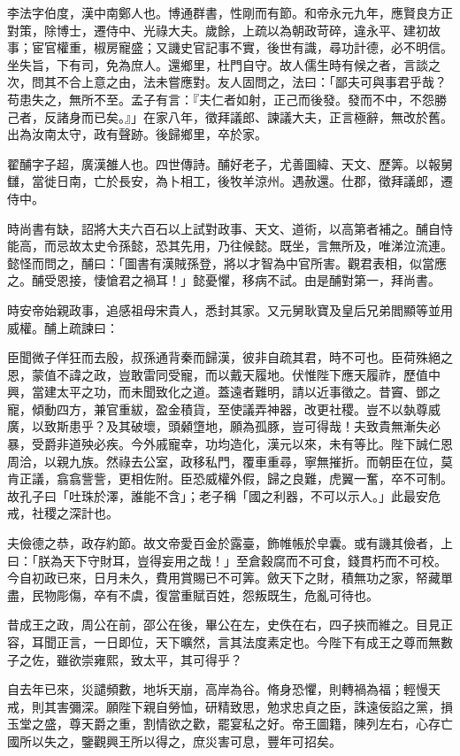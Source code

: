 \begin{pinyinscope}
李法字伯度，漢中南鄭人也。博通群書，性剛而有節。和帝永元九年，應賢良方正對策，除博士，遷侍中、光祿大夫。歲餘，上疏以為朝政苛碎，違永平、建初故事；宦官權重，椒房寵盛；又譏史官記事不實，後世有識，尋功計德，必不明信。坐失旨，下有司，免為庶人。還鄉里，杜門自守。故人儒生時有候之者，言談之次，問其不合上意之由，法未嘗應對。友人固問之，法曰：「鄙夫可與事君乎哉？苟患失之，無所不至。孟子有言：『夫仁者如射，正己而後發。發而不中，不怨勝己者，反諸身而已矣。』」在家八年，徵拜議郎、諫議大夫，正言極辭，無改於舊。出為汝南太守，政有聲跡。後歸鄉里，卒於家。

翟酺字子超，廣漢雒人也。四世傳詩。酺好老子，尤善圖緯、天文、歷筭。以報舅讎，當徙日南，亡於長安，為卜相工，後牧羊涼州。遇赦還。仕郡，徵拜議郎，遷侍中。

時尚書有缺，詔將大夫六百石以上試對政事、天文、道術，以高第者補之。酺自恃能高，而忌故太史令孫懿，恐其先用，乃往候懿。既坐，言無所及，唯涕泣流連。懿怪而問之，酺曰：「圖書有漢賊孫登，將以才智為中官所害。觀君表相，似當應之。酺受恩接，悽愴君之禍耳！」懿憂懼，移病不試。由是酺對第一，拜尚書。

時安帝始親政事，追感祖母宋貴人，悉封其家。又元舅耿寶及皇后兄弟閻顯等並用威權。酺上疏諫曰：

臣聞微子佯狂而去殷，叔孫通背秦而歸漢，彼非自疏其君，時不可也。臣荷殊絕之恩，蒙值不諱之政，豈敢雷同受寵，而以戴天履地。伏惟陛下應天履祚，歷值中興，當建太平之功，而未聞致化之道。蓋遠者難明，請以近事徵之。昔竇、鄧之寵，傾動四方，兼官重紱，盈金積貨，至使議弄神器，改更社稷。豈不以埶尊威廣，以致斯患乎？及其破壞，頭顙墯地，願為孤豚，豈可得哉！夫致貴無漸失必暴，受爵非道殃必疾。今外戚寵幸，功均造化，漢元以來，未有等比。陛下誠仁恩周洽，以親九族。然祿去公室，政移私門，覆車重尋，寧無摧折。而朝臣在位，莫肯正議，翕翕訾訾，更相佐附。臣恐威權外假，歸之良難，虎翼一奮，卒不可制。故孔子曰「吐珠於澤，誰能不含」；老子稱「國之利器，不可以示人。」此最安危戒，社稷之深計也。

夫儉德之恭，政存約節。故文帝愛百金於露臺，飾帷帳於皁囊。或有譏其儉者，上曰：「朕為天下守財耳，豈得妄用之哉！」至倉穀腐而不可食，錢貫朽而不可校。今自初政已來，日月未久，費用賞賜已不可筭。斂天下之財，積無功之家，帑藏單盡，民物彫傷，卒有不虞，復當重賦百姓，怨叛既生，危亂可待也。

昔成王之政，周公在前，邵公在後，畢公在左，史佚在右，四子挾而維之。目見正容，耳聞正言，一日即位，天下曠然，言其法度素定也。今陛下有成王之尊而無數子之佐，雖欲崇雍熙，致太平，其可得乎？

自去年已來，災譴頻數，地坼天崩，高岸為谷。脩身恐懼，則轉禍為福；輕慢天戒，則其害彌深。願陛下親自勞恤，研精致思，勉求忠貞之臣，誅遠佞諂之黨，損玉堂之盛，尊天爵之重，割情欲之歡，罷宴私之好。帝王圖籍，陳列左右，心存亡國所以失之，鑒觀興王所以得之，庶災害可息，豐年可招矣。


\end{pinyinscope}
